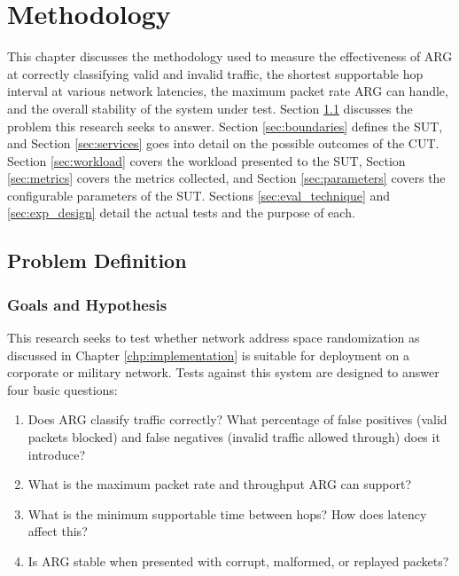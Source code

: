 \chapter{Methodology}
\label{chp:methodology}

\par This chapter discusses the methodology used to measure the effectiveness of \ac{ARG} at correctly classifying valid and invalid traffic, the shortest supportable hop interval at various network latencies, the maximum packet rate \ac{ARG} can handle, and the overall stability of the system under test. Section \ref{sec:problem_def} discusses the problem this research seeks to answer. Section \ref{sec:boundaries} defines the \ac{SUT}, and Section \ref{sec:services} goes into detail on the possible outcomes of the \ac{CUT}. Section \ref{sec:workload} covers the workload presented to the \ac{SUT}, Section \ref{sec:metrics} covers the metrics collected, and Section \ref{sec:parameters} covers the configurable parameters of the \ac{SUT}. Sections \ref{sec:eval_technique} and \ref{sec:exp_design} detail the actual tests and the purpose of each.

\section{Problem Definition}
\label{sec:problem_def}
\subsection{Goals and Hypothesis}
\label{sec:goals}
\par This research seeks to test whether network address space randomization as discussed in Chapter \ref{chp:implementation} is suitable for deployment on a corporate or military network. Tests against this system are designed to answer four basic questions:

\begin{enumerate}
\item Does \ac{ARG} classify traffic correctly? What percentage of false positives (valid packets blocked) and false negatives (invalid traffic allowed through) does it introduce?
\item What is the maximum packet rate and throughput \ac{ARG} can support?
\item What is the minimum supportable time between hops? How does latency affect this?
\item Is \ac{ARG} stable when presented with corrupt, malformed, or replayed packets?
\end{enumerate}

